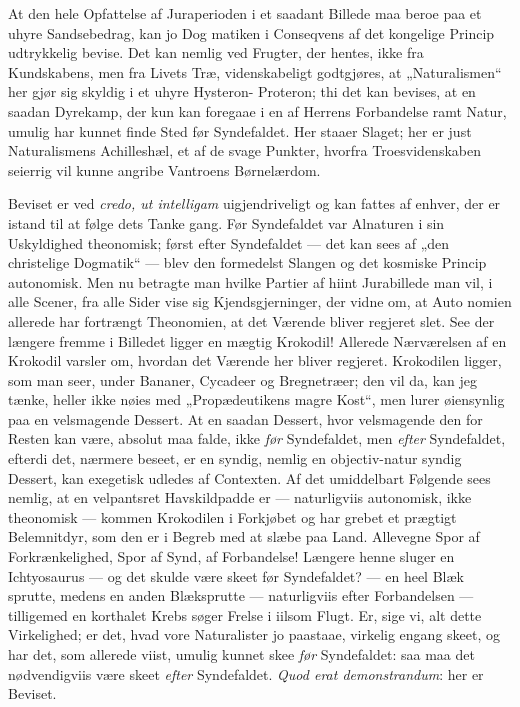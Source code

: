 \documentclass[12pt]{book}
\newcommand{\opage}[1]{\marginnote{\footnotesize\textit{[#1]}}}
\begin{document}
At den hele Opfattelse af Juraperioden i et saadant
Billede maa beroe paa et uhyre Sandsebedrag, kan jo Dog\-%
matiken i Conseqvens af det kongelige Princip udtrykkelig
bevise. Det kan nemlig ved Frugter, der hentes, ikke fra
Kundskabens, men fra Livets Træ, videnskabeligt godtgjøres,
at „Naturalismen“ her gjør sig skyldig i et uhyre Hysteron-%
Proteron; thi det kan bevises, at en saadan Dyrekamp, der
kun kan foregaae i en af Herrens Forbandelse ramt Natur,
umulig har kunnet finde Sted før Syndefaldet. Her staaer
Slaget; her er just Naturalismens Achilleshæl, et af de
svage Punkter, hvorfra Troesvidenskaben seierrig vil kunne
angribe Vantroens Børnelærdom.

Beviset er ved \textit{credo, ut intelligam} uigjendriveligt og
kan fattes af enhver, der er istand til at følge dets Tanke\-%
gang. Før Syndefaldet var Alnaturen i sin Uskyldighed
theonomisk; først efter Syndefaldet --- det kan sees af „den
christelige Dogmatik“ --- blev den formedelst Slangen og det
\opage{23}\setcounter{footnote}{0}%
kosmiske Princip autonomisk. Men nu betragte man hvilke
Partier af hiint Jurabillede man vil, i alle Scener, fra alle
Sider vise sig Kjendsgjerninger, der vidne om, at Auto\-%
nomien allerede har fortrængt Theonomien, at det Værende
bliver regjeret slet. See der længere fremme i Billedet
ligger en mægtig Krokodil! Allerede Nærværelsen af en
Krokodil varsler om, hvordan det Værende her bliver regjeret.
Krokodilen ligger, som man seer, under Bananer, Cycadeer
og Bregnetræer; den vil da, kan jeg tænke, heller ikke nøies
med „Propædeutikens magre Kost“, men lurer øiensynlig
paa en velsmagende Dessert. At en saadan Dessert, hvor
velsmagende den for Resten kan være, absolut maa falde, ikke
\emph{før} Syndefaldet, men \emph{efter} Syndefaldet, efterdi det,
nærmere beseet, er en syndig, nemlig en objectiv-natur\-%
syndig Dessert, kan exegetisk udledes af Contexten. Af
det umiddelbart Følgende sees nemlig, at en velpantsret
Havskildpadde er --- naturligviis autonomisk, ikke theonomisk
--- kommen Krokodilen i Forkjøbet og har grebet et prægtigt
Belemnitdyr, som den er i Begreb med at slæbe paa Land.
Allevegne Spor af Forkrænkelighed, Spor af Synd, af
Forbandelse! Længere henne sluger en Ichtyosaurus --- og %
det skulde være skeet før Syndefaldet? --- en heel Blæk\-%
sprutte, medens en anden Blæksprutte --- naturligviis efter
Forbandelsen --- tilligemed en korthalet Krebs søger Frelse i
iilsom Flugt. Er, sige vi, alt dette Virkelighed; er det, hvad vore
Naturalister jo paastaae, virkelig engang skeet, og har det,
som allerede viist, umulig kunnet skee \emph{før} Syndefaldet: saa
maa det nødvendigviis være skeet \emph{efter} Syndefaldet. \textit{Quod
erat demonstrandum}: her er Beviset.
\end{document}
